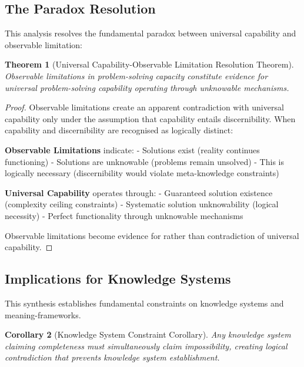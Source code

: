 \documentclass[12pt,a4paper]{article}
\newtheorem{theorem}{Theorem}[section]
\newtheorem{corollary}[theorem]{Corollary}
\begin{document}
\subsection{The Paradox Resolution}

This analysis resolves the fundamental paradox between universal capability and observable limitation:

\begin{theorem}[Universal Capability-Observable Limitation Resolution Theorem]
Observable limitations in problem-solving capacity constitute evidence for universal problem-solving capability operating through unknowable mechanisms.
\end{theorem}

\begin{proof}
Observable limitations create an apparent contradiction with universal capability only under the assumption that capability entails discernibility. When capability and discernibility are recognised as logically distinct:

\textbf{Observable Limitations} indicate:
- Solutions exist (reality continues functioning)
- Solutions are unknowable (problems remain unsolved)
- This is logically necessary (discernibility would violate meta-knowledge constraints)

\textbf{Universal Capability} operates through:
- Guaranteed solution existence (complexity ceiling constraints)
- Systematic solution unknowability (logical necessity)
- Perfect functionality through unknowable mechanisms

Observable limitations become evidence for rather than contradiction of universal capability.
\end{proof}

\subsection{Implications for Knowledge Systems}

This synthesis establishes fundamental constraints on knowledge systems and meaning-frameworks.

\begin{corollary}[Knowledge System Constraint Corollary]
Any knowledge system claiming completeness must simultaneously claim impossibility, creating logical contradiction that prevents knowledge system establishment.
\end{corollary}
\end{document}
